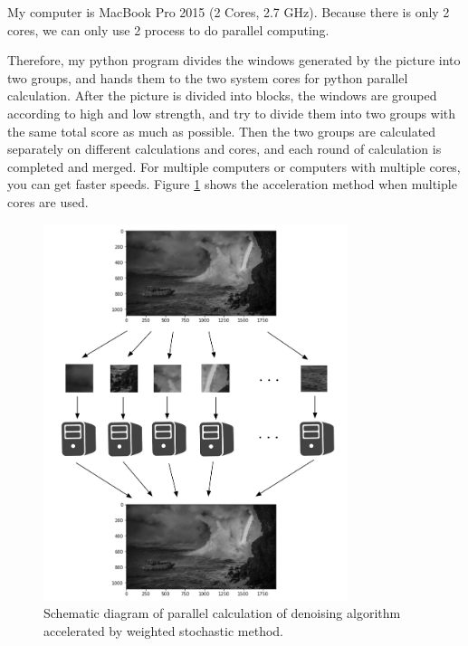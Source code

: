 \documentclass{article}
\begin{document}
My computer is MacBook Pro 2015 (2 Cores, 2.7 GHz). Because there is only 2 cores, we can only use 2 process to do parallel computing.

Therefore, my python program divides the windows generated by the picture into two groups, and hands them to the two system cores for python parallel calculation. After the picture is divided into blocks, the windows are grouped according to high and low strength, and try to divide them into two groups with the same total score as much as possible. Then the two groups are calculated separately on different calculations and cores, and each round of calculation is completed and merged. For multiple computers or computers with multiple cores, you can get faster speeds. Figure \ref{img24} shows the acceleration method when multiple cores are used.

\begin{figure}[h]
  \includegraphics[width=3.5in]{pic24.png}
  \centering
  \caption{Schematic diagram of parallel calculation of denoising algorithm accelerated by weighted stochastic method.}
  \label{img24}
\end{figure}
\end{document}
